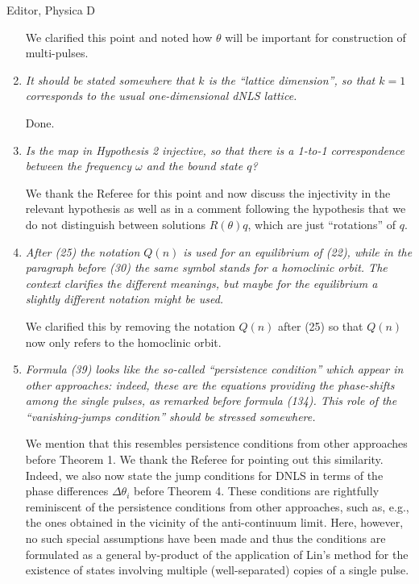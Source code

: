 \documentclass[11pt]{letter}
\begin{document}
\begin{letter}{Editor, Physica D}
\begin{enumerate}
\vspace{4mm}
We clarified this point and noted how $\theta$ will be important for construction of multi-pulses.
\vspace{4mm}

\item \emph{It should be stated somewhere that $k$ is the ``lattice dimension'', so that $k = 1$ corresponds to the usual one-dimensional dNLS lattice. }

\vspace{4mm}
Done.
\vspace{4mm}

\item \emph{Is the map in Hypothesis 2 injective, so that there is a 1-to-1 correspondence between the frequency $\omega$ and the bound state $q$?}

\vspace{4mm}
We thank the Referee for this point and now discuss the injectivity in the relevant hypothesis as well as in a comment following the hypothesis that we do not distinguish between solutions $R(\theta)q$, which are just ``rotations'' of $q$.
\vspace{4mm}

\item \emph{After (25) the notation $Q(n)$ is used for an equilibrium of (22), while in the paragraph before (30) the same symbol stands for a homoclinic orbit. The context clarifies the different meanings, but maybe for the equilibrium a slightly different notation might be used.}

\vspace{4mm}
We clarified this by removing the notation $Q(n)$ after (25) so that $Q(n)$ now only refers to the homoclinic orbit.
\vspace{4mm}

\item \emph{Formula (39) looks like the so-called ``persistence condition'' which appear in other approaches: indeed, these are the equations providing the phase-shifts among the single pulses, as remarked before formula (134). This role of the ``vanishing-jumps condition'' should be stressed somewhere.}

\vspace{4mm}
We mention that this resembles persistence conditions from other approaches before Theorem 1. We thank the Referee for pointing out this similarity.
Indeed, we also now state the jump conditions for DNLS in terms of the phase differences $\Delta \theta_i$ before Theorem 4.
These conditions are rightfully reminiscent of the persistence
conditions from other approaches, such as, e.g., the ones
obtained in the vicinity of the anti-continuum limit.
Here, however, no such special assumptions have been
made and thus the conditions are formulated as a general
by-product of the application of Lin's method for the existence
of states involving multiple (well-separated) copies of a
single pulse.
\vspace{4mm}


\end{enumerate}
\end{letter}
\end{document}
